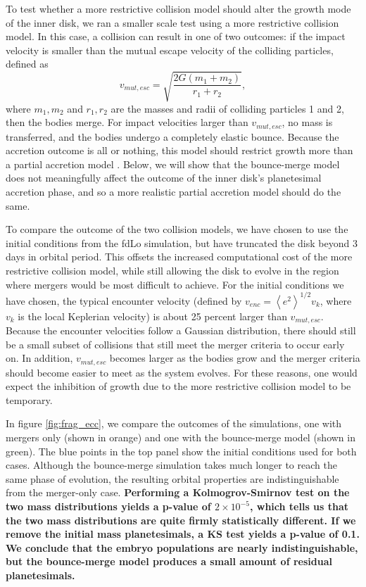 \documentclass[twocolumn,linenumbers]{aastex63}
\begin{document}
To test whether a more restrictive collision model should alter the growth mode of the inner disk, we ran a smaller scale test 
using a more restrictive collision model. In this case, a collision can result in one of two outcomes: if the impact velocity is 
smaller than the mutual escape velocity of the colliding particles, defined as
\begin{equation}\label{eq:v_mut}
	v_{mut, esc} = \sqrt{\frac{2 G (m_{1} + m_{2})}{r_{1} + r_{2}}},
\end{equation}
where $m_{1}, m_{2}$ and $r_{1}, r_{2}$ are the masses and radii of
colliding particles 1 and 2, then the bodies merge. For
impact velocities larger than $v_{mut, esc}$, no mass is transferred, and the bodies undergo a completely elastic bounce. 
Because the accretion outcome is all or nothing, this model should restrict growth more than a partial accretion model 
\citep{leinhardt12}. Below, we will show that the bounce-merge model does not meaningfully affect the outcome of the inner 
disk's planetesimal accretion phase, and so a more realistic partial accretion model should do the same.

To compare the outcome of the two collision models, we have chosen to use the initial conditions from the fdLo simulation, but 
have truncated the disk beyond 3 days in orbital period. This offsets the increased computational cost of the more restrictive collision model, while still allowing the disk to evolve in the region where mergers would be most difficult to achieve.
For the initial conditions we have chosen, the typical encounter velocity (defined by $v_{enc} = \left< e^{2} \right>^{1/2} v_{k}$, 
where $v_{k}$ is the local Keplerian velocity) is about 25 percent larger than $v_{mut, esc}$. Because the encounter velocities 
follow a Gaussian distribution, there should still be a small subset of collisions that still meet the merger criteria to occur early on. 
In addition, $v_{mut, esc}$ becomes larger as the bodies grow and the merger criteria should become easier to meet as the 
system evolves. For these reasons, one would expect the inhibition of growth due to the more restrictive collision model to be 
temporary.

In figure \ref{fig:frag_ecc}, we compare the outcomes of the simulations, one with mergers only (shown in orange) and one with 
the bounce-merge model (shown in green). The blue points in the top panel show the initial conditions used for both cases. 
Although the bounce-merge simulation takes much longer to reach the same phase of evolution, the resulting orbital properties
are indistinguishable from the merger-only case. \textbf{Performing a Kolmogrov-Smirnov test on the two mass distributions yields
a p-value of $2 \times 10^{-5}$, which tells us that the two mass distributions are quite firmly statistically different. If we remove
the initial mass planetesimals, a KS test yields a p-value of 0.1. We conclude that the embryo populations are nearly indistinguishable,
but the bounce-merge model produces a small amount of residual planetesimals.}
\end{document}
